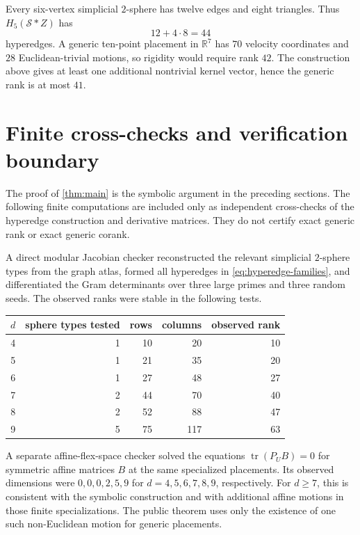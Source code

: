 \documentclass[11pt]{article}
\theoremstyle{definition}
\newcommand{\R}{\mathbb{R}}
\newcommand{\cS}{\mathcal{S}}
\newcommand{\tr}{\operatorname{tr}}
\begin{document}
Every six-vertex simplicial \(2\)-sphere has twelve edges and eight
triangles.  Thus \(H_5(\cS*Z)\) has
\[
  12+4\cdot 8=44
\]
hyperedges.  A generic ten-point placement in \(\R^7\) has \(70\)
velocity coordinates and \(28\) Euclidean-trivial motions, so rigidity
would require rank \(42\).  The construction above gives at least one
additional nontrivial kernel vector, hence the generic rank is at most
\(41\).

\section{Finite cross-checks and verification boundary}
\label{sec:verification}

The proof of \cref{thm:main} is the symbolic argument in the preceding
sections.  The following finite computations are included only as
independent cross-checks of the hyperedge construction and derivative
matrices.  They do not certify exact generic rank or exact generic
corank.

A direct modular Jacobian checker reconstructed the relevant
simplicial \(2\)-sphere types from the graph atlas, formed all
hyperedges in \eqref{eq:hyperedge-families}, and differentiated the
Gram determinants over three large primes and three random seeds.  The
observed ranks were stable in the following tests.

\begin{center}
\small
\begin{tabular}{rrrrr}
\toprule
\(d\) & sphere types tested & rows & columns & observed rank\\
\midrule
4 & 1 & 10 & 20 & 10\\
5 & 1 & 21 & 35 & 20\\
6 & 1 & 27 & 48 & 27\\
7 & 2 & 44 & 70 & 40\\
8 & 2 & 52 & 88 & 47\\
9 & 5 & 75 & 117 & 63\\
\bottomrule
\end{tabular}
\end{center}

A separate affine-flex-space checker solved the equations
\(\tr(P_U B)=0\) for symmetric affine matrices \(B\) at the same
specialized placements.  Its observed dimensions were \(0,0,0,2,5,9\)
for \(d=4,5,6,7,8,9\), respectively.  For \(d\geq 7\), this is
consistent with the symbolic construction and with additional affine
motions in those finite specializations.  The public theorem uses only
the existence of one such non-Euclidean motion for generic placements.
\end{document}
